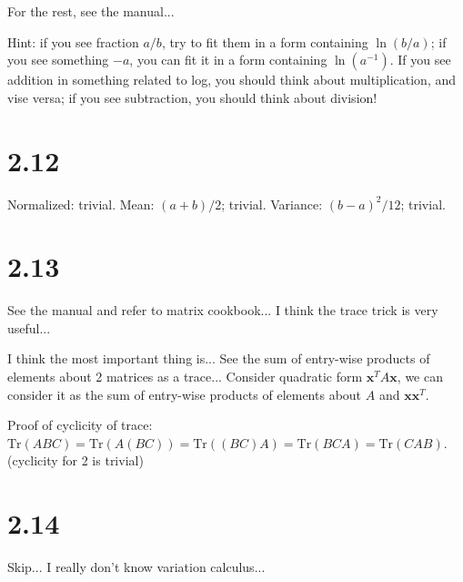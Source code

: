 \documentclass[12pt]{article}
\newcommand{\vect}[1]{\mathbf{#1}}
\begin{document}
For the rest, see the manual...

Hint: if you see fraction $a/b$, try to fit them in a form containing $\ln(b/a)$; if you see something $-a$, you can fit it in a form containing $\ln(a^{-1})$. If you see addition in something related to log, you should think about multiplication, and vise versa; if you see subtraction, you should think about division!

\section{2.12}
Normalized: trivial.
Mean: $(a+b)/2$; trivial.
Variance: $(b-a)^2/12$; trivial.

\section{2.13}
See the manual and refer to matrix cookbook... I think the trace trick is very useful...

I think the most important thing is... See the sum of entry-wise products of elements about 2 matrices as a trace... Consider quadratic form $\vect{x}^T A \vect{x}$, we can consider it as the sum of entry-wise products of elements about $A$ and $\vect{x} \vect{x}^T$.

Proof of cyclicity of trace: $\mathrm{Tr}(ABC)=\mathrm{Tr}(A(BC))=\mathrm{Tr}((BC)A)=\mathrm{Tr}(BCA)=\mathrm{Tr}(CAB)$. (cyclicity for 2 is trivial)



\section{2.14}
Skip... I really don't know variation calculus...
\end{document}
